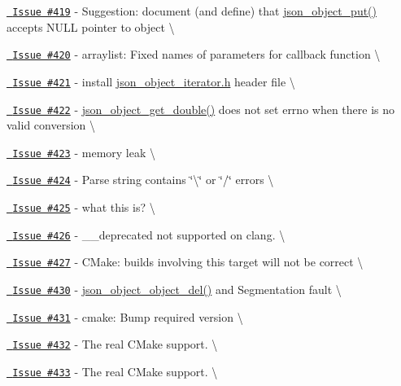 \begin{DoxyItemize}
\item \href{https://github.com/json-c/json-c/issues/419}{\texttt{ Issue \#419}} -\/ Suggestion\+: document (and define) that \mbox{\hyperlink{json__object_8h_afabf61f932cd64a4122ca8092452eed5}{json\+\_\+object\+\_\+put()}} accepts NULL pointer to object \textbackslash{}
\item \href{https://github.com/json-c/json-c/issues/420}{\texttt{ Issue \#420}} -\/ arraylist\+: Fixed names of parameters for callback function \textbackslash{}
\item \href{https://github.com/json-c/json-c/issues/421}{\texttt{ Issue \#421}} -\/ install \mbox{\hyperlink{json__object__iterator_8h}{json\+\_\+object\+\_\+iterator.\+h}} header file \textbackslash{}
\item \href{https://github.com/json-c/json-c/issues/422}{\texttt{ Issue \#422}} -\/ \mbox{\hyperlink{json__object_8h_a94a70cff6a14398b581b7b10b0792c5b}{json\+\_\+object\+\_\+get\+\_\+double()}} does not set errno when there is no valid conversion \textbackslash{}
\item \href{https://github.com/json-c/json-c/issues/423}{\texttt{ Issue \#423}} -\/ memory leak \textbackslash{}
\item \href{https://github.com/json-c/json-c/issues/424}{\texttt{ Issue \#424}} -\/ Parse string contains \char`\"{}\textbackslash{}\char`\"{} or \char`\"{}/\char`\"{} errors \textbackslash{}
\item \href{https://github.com/json-c/json-c/issues/425}{\texttt{ Issue \#425}} -\/ what this is? \textbackslash{}
\item \href{https://github.com/json-c/json-c/issues/426}{\texttt{ Issue \#426}} -\/ \+\_\+\+\_\+deprecated not supported on clang. \textbackslash{}
\item \href{https://github.com/json-c/json-c/issues/427}{\texttt{ Issue \#427}} -\/ CMake\+: builds involving this target will not be correct \textbackslash{}
\item \href{https://github.com/json-c/json-c/issues/430}{\texttt{ Issue \#430}} -\/ \mbox{\hyperlink{json__object_8h_ac6605fdafca20bd5d33c84f4f80a3bda}{json\+\_\+object\+\_\+object\+\_\+del()}} and Segmentation fault \textbackslash{}
\item \href{https://github.com/json-c/json-c/issues/431}{\texttt{ Issue \#431}} -\/ cmake\+: Bump required version \textbackslash{}
\item \href{https://github.com/json-c/json-c/issues/432}{\texttt{ Issue \#432}} -\/ The real CMake support. \textbackslash{}
\item \href{https://github.com/json-c/json-c/issues/433}{\texttt{ Issue \#433}} -\/ The real CMake support. \textbackslash{}

\end{DoxyItemize}
